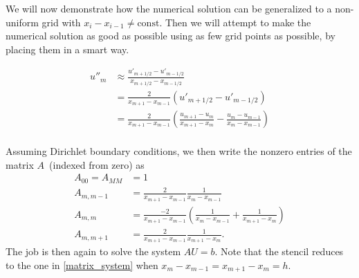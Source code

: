 \label{ex1_amr_section}

We will now demonstrate how the numerical solution can be generalized to a non-uniform grid with $x_i - x_{i-1} \neq \text{const}$.
Then we will attempt to make the numerical solution as good as possible using as few grid points as possible, by placing them in a smart way.

\newcommand\nonuniformstencil[4]{\frac{2}{x_{#4}-x_{#2}} \left( \frac{#1_{#4}-#1_{#3}}{x_{#4}-x_{#3}} - \frac{#1_{#3}-#1_{#2}}{x_{#3}-x_{#2}} \right)}
\begin{equation}
\begin{split}
u''_m &\approx \frac{u'_{m+1/2} - u'_{m-1/2}}{x_{m+1/2}-x_{m-1/2}} \\
      &=       \frac{2}{x_{m+1}-x_{m-1}} \left( u'_{m+1/2} - u'_{m-1/2} \right) \\
	  &= \nonuniformstencil{u}{m-1}{m}{m+1} \\
\end{split}
\label{amr_stencil}
\end{equation}

\newcommand\hleft{x_m-x_{m-1}}
\newcommand\hright{x_{m+1}-x_m}
\newcommand\hfull{x_{m+1}-x_{m-1}}
Assuming Dirichlet boundary conditions, we then write the nonzero entries of the matrix $A$ (indexed from zero) as
\begin{equation*}
\begin{split}
A_{00} = A_{MM} &= 1 \\
A_{m,m-1}       &= \frac{2}{\hfull} \frac{1}{\hleft} \\
A_{m,m  }       &= \frac{-2}{\hfull} \left( \frac{1}{\hleft} + \frac{1}{\hright} \right) \\
A_{m,m+1}       &= \frac{2}{\hfull} \frac{1}{\hright}.
\end{split}
\end{equation*}
The job is then again to solve the system $A U = b$.
Note that the stencil reduces to the one in \cref{matrix_system} when $\hleft = \hright = h$.

